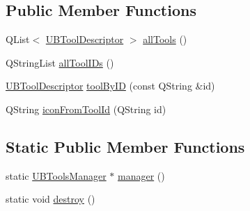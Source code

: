 \subsection*{Public Member Functions}
\begin{DoxyCompactItemize}
\item 
Q\-List$<$ \hyperlink{class_u_b_tools_manager_1_1_u_b_tool_descriptor}{U\-B\-Tool\-Descriptor} $>$ \hyperlink{class_u_b_tools_manager_aa7f4696ab8d5212f3901f3ccc2e1c571}{all\-Tools} ()
\item 
Q\-String\-List \hyperlink{class_u_b_tools_manager_a09df4696600759b5042bc889ac92b480}{all\-Tool\-I\-Ds} ()
\item 
\hyperlink{class_u_b_tools_manager_1_1_u_b_tool_descriptor}{U\-B\-Tool\-Descriptor} \hyperlink{class_u_b_tools_manager_a256995fde4af079fbd0dcfac80165133}{tool\-By\-I\-D} (const Q\-String \&id)
\item 
Q\-String \hyperlink{class_u_b_tools_manager_ac00f40af7c81f9b9ea4d2984bb018a52}{icon\-From\-Tool\-Id} (Q\-String id)
\end{DoxyCompactItemize}
\subsection*{Static Public Member Functions}
\begin{DoxyCompactItemize}
\item 
static \hyperlink{class_u_b_tools_manager}{U\-B\-Tools\-Manager} $\ast$ \hyperlink{class_u_b_tools_manager_a9180b06fd04c30bcbd4cb9e9aedfe80a}{manager} ()
\item 
static void \hyperlink{class_u_b_tools_manager_a5ee2b3b460c81f93fe6fe6e9aff724a3}{destroy} ()
\end{DoxyCompactItemize}
